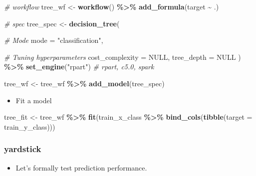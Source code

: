 \documentclass[
]{book}
\newenvironment{Shaded}{\begin{snugshade}}{\end{snugshade}}
\newcommand{\AttributeTok}[1]{\textcolor[rgb]{0.13,0.29,0.53}{#1}}
\newcommand{\CommentTok}[1]{\textcolor[rgb]{0.56,0.35,0.01}{\textit{#1}}}
\newcommand{\ConstantTok}[1]{\textcolor[rgb]{0.56,0.35,0.01}{#1}}
\newcommand{\FunctionTok}[1]{\textcolor[rgb]{0.13,0.29,0.53}{\textbf{#1}}}
\newcommand{\NormalTok}[1]{#1}
\newcommand{\OtherTok}[1]{\textcolor[rgb]{0.56,0.35,0.01}{#1}}
\newcommand{\SpecialCharTok}[1]{\textcolor[rgb]{0.81,0.36,0.00}{\textbf{#1}}}
\newcommand{\StringTok}[1]{\textcolor[rgb]{0.31,0.60,0.02}{#1}}
\providecommand{\tightlist}{%
  \setlength{\itemsep}{0pt}\setlength{\parskip}{0pt}}
\begin{document}
\begin{Shaded}
\begin{Highlighting}[]
\CommentTok{\# workflow}
\NormalTok{tree\_wf }\OtherTok{\textless{}{-}} \FunctionTok{workflow}\NormalTok{() }\SpecialCharTok{\%\textgreater{}\%} \FunctionTok{add\_formula}\NormalTok{(target }\SpecialCharTok{\textasciitilde{}}\NormalTok{ .)}

\CommentTok{\# spec}
\NormalTok{tree\_spec }\OtherTok{\textless{}{-}} \FunctionTok{decision\_tree}\NormalTok{(}

  \CommentTok{\# Mode}
  \AttributeTok{mode =} \StringTok{"classification"}\NormalTok{,}

  \CommentTok{\# Tuning hyperparameters}
  \AttributeTok{cost\_complexity =} \ConstantTok{NULL}\NormalTok{,}
  \AttributeTok{tree\_depth =} \ConstantTok{NULL}
\NormalTok{) }\SpecialCharTok{\%\textgreater{}\%}
  \FunctionTok{set\_engine}\NormalTok{(}\StringTok{"rpart"}\NormalTok{) }\CommentTok{\# rpart, c5.0, spark}

\NormalTok{tree\_wf }\OtherTok{\textless{}{-}}\NormalTok{ tree\_wf }\SpecialCharTok{\%\textgreater{}\%} \FunctionTok{add\_model}\NormalTok{(tree\_spec)}
\end{Highlighting}
\end{Shaded}

\begin{itemize}
\tightlist
\item
  Fit a model
\end{itemize}

\begin{Shaded}
\begin{Highlighting}[]
\NormalTok{tree\_fit }\OtherTok{\textless{}{-}}\NormalTok{ tree\_wf }\SpecialCharTok{\%\textgreater{}\%} \FunctionTok{fit}\NormalTok{(train\_x\_class }\SpecialCharTok{\%\textgreater{}\%} \FunctionTok{bind\_cols}\NormalTok{(}\FunctionTok{tibble}\NormalTok{(}\AttributeTok{target =}\NormalTok{ train\_y\_class)))}
\end{Highlighting}
\end{Shaded}

\subsubsection{yardstick}\label{yardstick-1}

\begin{itemize}
\tightlist
\item
  Let's formally test prediction performance.
\end{itemize}
\end{document}
